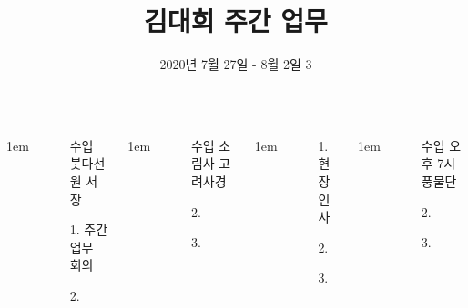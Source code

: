 \documentclass[25pt, a1paper ]{tikzposter}
\title{ 김대희 주간 업무 }
\author{ 2020년 7월 27일 - 8월 2일 3 }
\begin{document}
	\maketitle

	\begin{columns}


			{
					\setlength{\leftmargini}{4em}
					\setlength{\labelsep} {1em}
				\begin{LARGE}
					\begin{itemize}
					\item [수업] 붓다선원 서장
					\item [1.]주간 업무 회의
					\item [2.] 
					\end{itemize}
				\end{LARGE}
			}


			{
					\setlength{\leftmargini}{4em}
					\setlength{\labelsep} {1em}
				\begin{LARGE}
					\begin{itemize}
					\item [수업] 소림사 고려사경
					\item [2.] 
					\item [3.] 
					\end{itemize}
				\end{LARGE}
			}



			{
					\setlength{\leftmargini}{4em}
					\setlength{\labelsep} {1em}
				\begin{LARGE}
					\begin{itemize}
					\item [1.] 현장 인사 
					\item [2.] 
					\item [3.] 
					\end{itemize}
				\end{LARGE}
			}


			{
					\setlength{\leftmargini}{4em}
					\setlength{\labelsep} {1em}
				\begin{LARGE}
					\begin{itemize}
					\item [수업] 오후 7시 풍물단 
					\item [2.] 
					\item [3.] 
					\end{itemize}
				\end{LARGE}
			}


\end{columns}
\end{document}
